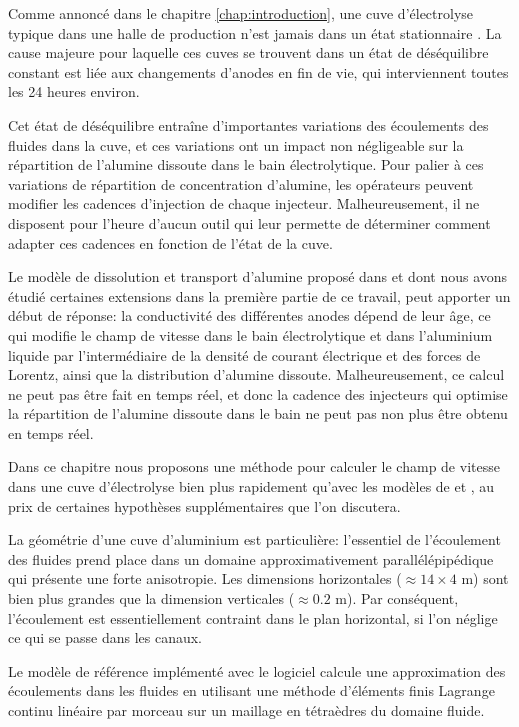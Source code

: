 Comme annoncé dans le chapitre \ref{chap:introduction}, une cuve
d'électrolyse typique dans une halle de production n'est jamais dans
un état stationnaire \cite{Steiner2009,Flotron2013}. La cause
majeure pour laquelle ces cuves se trouvent dans un état de
déséquilibre constant est liée aux changements d'anodes en fin de vie,
qui interviennent toutes les 24 heures environ.

Cet état de déséquilibre entraîne d'importantes variations des
écoulements des fluides dans la cuve, et ces variations ont un impact
non négligeable sur la répartition de l'alumine dissoute dans le bain
électrolytique. Pour palier à ces variations de répartition de
concentration d'alumine, les opérateurs peuvent modifier les cadences
d'injection de chaque injecteur. Malheureusement, il ne disposent pour
l'heure d'aucun outil qui leur permette de déterminer comment adapter
ces cadences en fonction de l'état de la cuve.

Le modèle de dissolution et transport d'alumine proposé dans
\cite{Hofer2011} et dont nous avons étudié certaines extensions dans
la première partie de ce travail, peut apporter un début de réponse: la
conductivité des différentes anodes dépend de leur âge, ce qui modifie
le champ de vitesse dans le bain électrolytique et dans l'aluminium
liquide par l'intermédiaire de la densité de courant
électrique et des forces de Lorentz, ainsi que la distribution d'alumine
dissoute. Malheureusement, ce calcul ne peut pas être fait en temps
réel, et donc la cadence des injecteurs qui optimise la répartition de
l'alumine dissoute dans le bain ne peut pas non plus être obtenu en
temps réel.

Dans ce chapitre nous proposons une méthode pour calculer le champ de
vitesse dans une cuve d'électrolyse bien plus rapidement qu'avec les
modèles de \cite{Steiner2009} et \cite{Hofer2011}, au prix de
certaines hypothèses supplémentaires que l'on discutera.

La géométrie d'une cuve d'aluminium est particulière: l'essentiel de
l'écoulement des fluides prend place dans un domaine approximativement
parallélépipédique qui présente une forte anisotropie. Les dimensions
horizontales ($\approx \num{14}\times\num{4}$ \si{\meter}) sont bien plus
grandes que la dimension verticales ($\approx \num{0.2}$ \si{\meter}). Par
conséquent, l'écoulement est essentiellement contraint dans le plan
horizontal, si l'on néglige ce qui se passe dans les canaux.

Le modèle de référence implémenté avec le logiciel \alucell{}
\cite{Steiner2009,Flotron2013,Hofer2011,Rochat2016} calcule une
approximation des écoulements dans les fluides en utilisant une
méthode d'éléments finis Lagrange continu linéaire par morceau sur un
maillage en tétraèdres du domaine fluide.

